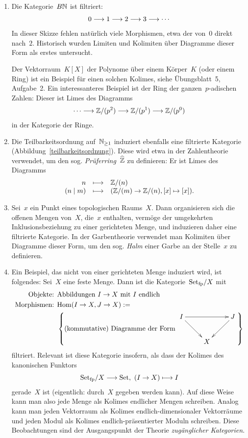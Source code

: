 \begin{bsp}\begin{enumerate}
\item Die Kategorie~$B\mathbb{N}$ ist filtriert:
\[ 0 \longrightarrow 1 \longrightarrow 2 \longrightarrow 3 \longrightarrow \cdots \]
In dieser Skizze fehlen natürlich viele Morphismen, etwa der von~$0$ direkt
nach~$2$. Historisch wurden Limiten und Kolimiten über Diagramme dieser Form
als erstes untersucht.

Der Vektorraum~$K[X]$ der Polynome über einem Körper~$K$ (oder einem Ring) ist
ein Beispiel für einen solchen Kolimes, siehe Übungsblatt~5, Aufgabe~2. Ein
interessanteres Beispiel ist der Ring der ganzen~$p$-adischen Zahlen: Dieser
ist Limes des Diagramms
\[ \cdots \longrightarrow \mathbb{Z}/(p^2) \longrightarrow \mathbb{Z}/(p^1) \longrightarrow \mathbb{Z}/(p^0) \]
in der Kategorie der Ringe.

\item Die Teilbarkeitsordnung auf~$\mathbb{N}_{\geq 1}$ induziert ebenfalls eine
filtrierte Kategorie (Abbildung~\ref{teilbarkeitsordnung}). Diese wird etwa
in der Zahlentheorie verwendet, um den sog. \emph{Prüferring}~$\widehat{\mathbb{Z}}$ zu
definieren: Er ist Limes des Diagramms
\[ \begin{array}{@{}rcl@{}}
  n &\longmapsto& \ZZ/(n) \\
  (n \mid m) &\longmapsto& (\ZZ/(m) \to \ZZ/(n), [x] \mapsto [x]).
\end{array} \]

\item Sei~$x$ ein Punkt eines topologischen Raums~$X$. Dann organisieren sich
die offenen Mengen von~$X$, die~$x$ enthalten, vermöge der umgekehrten
Inklusionsbeziehung zu einer gerichteten Menge, und induzieren daher eine
filtrierte Kategorie. In der Garbentheorie verwendet man Kolimiten über
Diagramme dieser Form, um den sog. \emph{Halm} einer Garbe an der Stelle~$x$ zu
definieren.

\item Ein Beispiel, das nicht von einer gerichteten Menge induziert wird, ist
folgendes: Sei~$X$ eine feste Menge. Dann ist die Kategorie~$\mathrm{Set}_\mathrm{fp}/X$ mit
\begin{align*}
  \text{Objekte: } & \text{Abbildungen $I \to X$ mit $I$ endlich} \\
  \text{Morphismen: } &
    \Hom(I \to X, J \to X) := \\ & \left\{
    \text{(kommutative) Diagramme der Form $\vcenter{\xymatrix{
       I \ar[rr] \ar[dr] & & J \ar[ld] \\
       & X
      }}$} \right\}
\end{align*}
filtriert. Relevant ist diese Kategorie insofern, als dass der Kolimes des
kanonischen Funktors
\[ \mathrm{Set}_\mathrm{fp}/X \longrightarrow \mathrm{Set},\ (I \to X) \longmapsto I \]
gerade~$X$ ist (eigentlich: durch~$X$ gegeben werden kann). Auf diese Weise
kann man also jede Menge als Kolimes endlicher Mengen schreiben.
Analog kann man jeden Vektorraum als Kolimes endlich-dimensionaler Vektorräume
und jeden Modul als Kolimes endlich-präsentierter Moduln schreiben. Diese
Beobachtungen sind der Ausgangspunkt der Theorie \emph{zugänglicher Kategorien}.
\end{enumerate}\end{bsp}

